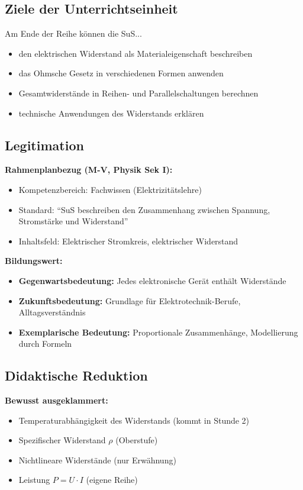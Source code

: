 \documentclass[11pt,a4paper]{article}
\begin{document}
\subsection{Ziele der Unterrichtseinheit}
Am Ende der Reihe können die SuS...
\begin{itemize}
    \item den elektrischen Widerstand als Materialeigenschaft beschreiben
    \item das Ohmsche Gesetz in verschiedenen Formen anwenden
    \item Gesamt\-wider\-stände in Reihen- und Parallelschaltungen berechnen
    \item technische Anwendungen des Widerstands erklären
\end{itemize}

\subsection{Legitimation}
\textbf{Rahmenplanbezug (M-V, Physik Sek I):}
\begin{itemize}
    \item Kompetenzbereich: Fachwissen (Elektrizitätslehre)
    \item Standard: ``SuS beschreiben den Zusammenhang zwischen Spannung, Stromstärke und Widerstand''
    \item Inhaltsfeld: Elektrischer Stromkreis, elektrischer Widerstand
\end{itemize}

\textbf{Bildungswert:}
\begin{itemize}
    \item \textbf{Gegenwartsbedeutung:} Jedes elektronische Gerät enthält Widerstände
    \item \textbf{Zukunftsbedeutung:} Grundlage für Elektrotechnik-Berufe, Alltagsverständnis
    \item \textbf{Exemplarische Bedeutung:} Proportionale Zusammenhänge, Modellierung durch Formeln
\end{itemize}

\subsection{Didaktische Reduktion}
\textbf{Bewusst ausgeklammert:}
\begin{itemize}
    \item Temperaturabhängigkeit des Widerstands (kommt in Stunde 2)
    \item Spezifischer Widerstand $\rho$ (Oberstufe)
    \item Nichtlineare Widerstände (nur Erwähnung)
    \item Leistung $P = U \cdot I$ (eigene Reihe)
\end{itemize}
\end{document}
